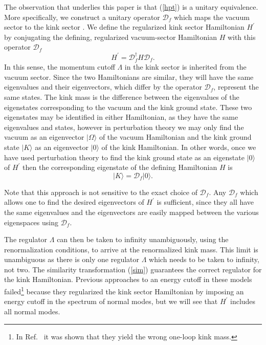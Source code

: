 \def\letter{0}\def\pr{0}\documentclass[a4paper,12pt, epsfig]{article}
\newcommand{\vac}{\ensuremath{|0\rangle}}
\renewcommand{\(}{\begin{equation}}
\renewcommand{\)}{end{equation} \vspace{-.05in}\linebreak}
\renewcommand{\=}{\hspace{-.03in}=\hspace{-.02in}}
\renewcommand{\(}{\begin{equation}}
\renewcommand{\)}{\end{equation}}
\renewcommand{\(}{\begin{equation}}
\renewcommand{\)}{\end{equation}}
\def\df{\mathcal{D}_f}
\renewcommand{\L}{{(\Lambda)}}
\def\co{{\mathcal{O}}}
\newcommand{\beq}{\begin{equation}}
\newcommand{\eeq}{\end{equation}}
\begin{document}
The observation that underlies this paper is that (\ref{hpt}) is a unitary equivalence.  More specifically, we construct a unitary operator $\df$ which maps the vacuum sector to the kink sector \cite{hepp,sato}.  We define the regularized kink sector Hamiltonian $H^{\prime}$ by conjugating the defining, regularized vacuum-sector Hamiltonian $H$ with this operator $\df$
\beq
H^{\prime}=\df^\dag H \df. \label{sim}
\eeq
In this sense, the momentum cutoff $\Lambda$ in the kink sector is inherited from the vacuum sector.  Since the two Hamiltonians are similar,  they will have the same eigenvalues and their eigenvectors, which differ by the operator $\df$, represent the same states.  The kink mass is the difference between the eigenvalues of the eigenstates corresponding to the vacuum and the kink ground state.  These two eigenstates may be identified in either Hamiltonian, as they have the same eigenvalues and states, however in perturbation theory we may only find the vacuum as an eigenvector $|\Omega\rangle$ of the vacuum Hamiltonian and the kink ground state $|K\rangle$ as an eigenvector $\vac$ of the kink Hamiltonian.  In other words, once we have used perturbation theory to find the kink ground state as an eigenstate $\vac$ of $H^{\prime}$ then the corresponding eigenstate of the defining Hamiltonian $H$ is 
\beq
|K\rangle=\df \vac. \label{co}
\eeq

Note that this approach is not sensitive to the exact choice of $\df$.  Any $\df$ which allows one to find the desired eigenvectors of $H^{\prime}$ is sufficient, since they all have the same eigenvalues and the eigenvectors are easily mapped between the various eigenspaces using $\df$.



The regulator $\Lambda$ can then be taken to infinity unambiguously, using the renormalization conditions, to arrive at the renormalized kink mass.  This limit is unambiguous as there is only one regulator $\Lambda$ which needs to be taken to infinity, not two.  The similarity transformation (\ref{sim}) guarantees the correct regulator for the kink Hamiltonian.  Previous approaches to an energy cutoff in these models failed\footnote{In Ref.~\cite{rebhan} it was shown that they yield the wrong one-loop kink mass.} because they regularized the kink sector Hamiltonian by imposing an energy cutoff in the spectrum of normal modes, but we will see that $H^{\prime}$ includes all normal modes.
\end{document}
